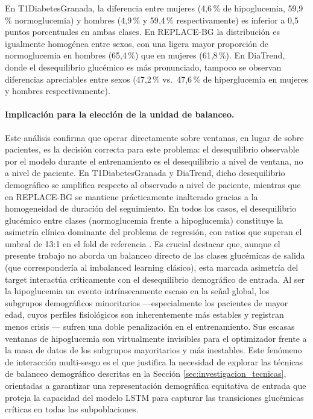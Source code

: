En T1DiabetesGranada, la diferencia entre mujeres (4{,}6\,\% de hipoglucemia, 59{,}9\,\% normoglucemia) y hombres (4{,}9\,\% y 59{,}4\,\% respectivamente) es inferior a 0{,}5 puntos porcentuales en ambas clases. En REPLACE-BG la distribución es igualmente homogénea entre sexos, con una ligera mayor proporción de normoglucemia en hombres (65{,}4\,\%) que en mujeres (61{,}8\,\%). En DiaTrend, donde el desequilibrio glucémico es más pronunciado, tampoco se observan diferencias apreciables entre sexos (47{,}2\,\% vs.\ 47{,}6\,\% de hiperglucemia en mujeres y hombres respectivamente).

\paragraph{Implicación para la elección de la unidad de balanceo.}
Este análisis confirma que operar directamente sobre ventanas, en lugar de sobre pacientes, es la decisión correcta para este problema: el desequilibrio observable por el modelo durante el entrenamiento es el desequilibrio a nivel de ventana, no a nivel de paciente. En T1DiabetesGranada y DiaTrend, dicho desequilibrio demográfico se amplifica respecto al observado a nivel de paciente, mientras que en REPLACE-BG se mantiene prácticamente inalterado gracias a la homogeneidad de duración del seguimiento. En todos los casos, el desequilibrio glucémico entre clases (normoglucemia frente a hipoglucemia) constituye la asimetría clínica dominante del problema de regresión, con ratios que superan el umbral de 13:1 en el fold de referencia . Es crucial destacar que, aunque el presente trabajo no aborda un balanceo directo de las clases glucémicas de salida (que correspondería al imbalanced learning clásico), esta marcada asimetría del target interactúa críticamente con el desequilibrio demográfico de entrada. Al ser la hipoglucemia un evento intrínsecamente escaso en la señal global, los subgrupos demográficos minoritarios —especialmente los pacientes de mayor edad, cuyos perfiles fisiológicos son inherentemente más estables y registran menos crisis — sufren una doble penalización en el entrenamiento. Sus escasas ventanas de hipoglucemia son virtualmente invisibles para el optimizador frente a la masa de datos de los subgrupos mayoritarios y más inestables. Este fenómeno de interacción multi-sesgo es el que justifica la necesidad de explorar las técnicas de balanceo demográfico descritas en la Sección \ref{sec:investigacion_tecnicas}, orientadas a garantizar una representación demográfica equitativa de entrada que proteja la capacidad del modelo LSTM para capturar las transiciones glucémicas críticas en todas las subpoblaciones.



